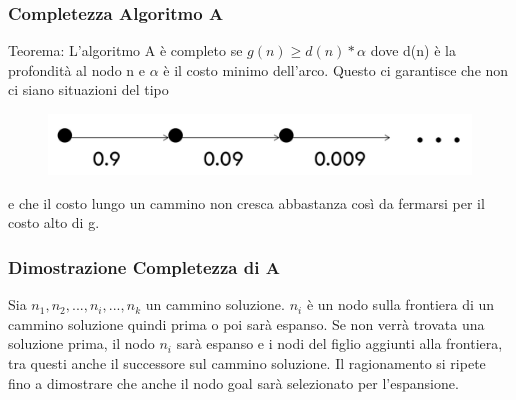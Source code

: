 \documentclass{article}
\begin{document}
\subsubsection{Completezza Algoritmo A}
Teorema: L'algoritmo A è completo se $g(n) \geq d(n)*\alpha$ dove d(n) è la profondità al nodo n e $\alpha$ è il costo minimo dell'arco. Questo ci garantisce che non ci siano situazioni del tipo 
\begin{figure}[H]
    \centering
    \includegraphics[scale=0.4]{Images/completezzaA.png}
\end{figure}
e che il costo lungo un cammino non cresca abbastanza così da fermarsi per il costo alto di g.

\subsubsection{Dimostrazione Completezza di A}
Sia $n_1, n_2, ..., n_i, ..., n_k$ un cammino soluzione. \newline
$n_i$ è un nodo sulla frontiera di un cammino soluzione quindi prima o poi sarà espanso. \newline
Se non verrà trovata una soluzione prima, il nodo $n_i$ sarà espanso e i nodi del figlio aggiunti alla frontiera, tra questi anche il successore sul cammino soluzione. Il ragionamento si ripete fino a dimostrare che anche il nodo goal sarà selezionato per l'espansione.
\end{document}

